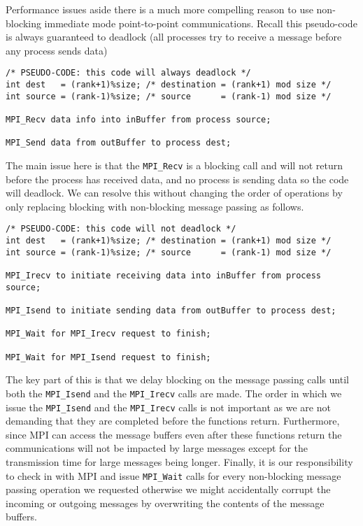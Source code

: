 Performance issues aside there is a much more compelling reason to use non-blocking immediate mode point-to-point communications. Recall this pseudo-code is always guaranteed to deadlock (all processes try to receive a message before any process sends data)

\begin{verbatim}
/* PSEUDO-CODE: this code will always deadlock */
int dest   = (rank+1)%size; /* destination = (rank+1) mod size */
int source = (rank-1)%size; /* source      = (rank-1) mod size */

MPI_Recv data info into inBuffer from process source;

MPI_Send data from outBuffer to process dest;
\end{verbatim}

The main issue here is that the \texttt{MPI\_Recv} is a blocking call and will not return before the process has received data, and no process is sending data so the code will deadlock. We can resolve this without changing the order of operations by only replacing blocking with non-blocking message passing as follows.

\begin{verbatim}
/* PSEUDO-CODE: this code will not deadlock */
int dest   = (rank+1)%size; /* destination = (rank+1) mod size */
int source = (rank-1)%size; /* source      = (rank-1) mod size */

MPI_Irecv to initiate receiving data into inBuffer from process source;

MPI_Isend to initiate sending data from outBuffer to process dest;

MPI_Wait for MPI_Irecv request to finish;

MPI_Wait for MPI_Isend request to finish;
\end{verbatim}

The key part of this is that we delay blocking on the message passing calls until both the \texttt{MPI\_Isend} and the \texttt{MPI\_Irecv} calls are made.
The order in which we issue the  \texttt{MPI\_Isend} and the \texttt{MPI\_Irecv} calls is not important as we are not demanding that they are completed before the functions return. Furthermore, since MPI can access the message buffers even after these functions return the communications will not be impacted by large messages except for the transmission time for large messages being longer. Finally, it is our responsibility to check in with MPI and issue \texttt{MPI\_Wait} calls for every non-blocking message passing operation we requested otherwise we might accidentally corrupt the incoming or outgoing messages by overwriting the contents of the message buffers.

